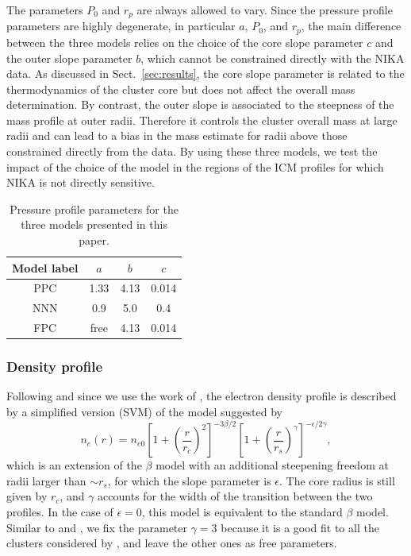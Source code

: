 \documentclass[twocolumn,traditabstract]{aa}
\begin{document}
The parameters $P_0$ and $r_p$ are always allowed to vary. Since the pressure profile parameters are highly degenerate, in particular $a$, $P_0$, and $r_p$, the main difference between the three models relies on the choice of the core slope parameter $c$ and the outer slope parameter $b$, which cannot be constrained directly with the NIKA data. As discussed in Sect.~\ref{sec:results}, the core slope parameter is related to the thermodynamics of the cluster core but does not affect the overall mass determination. By contrast, the outer slope is associated to the steepness of the mass profile at outer radii. Therefore it controls the cluster overall mass at large radii and can lead to a bias in the mass estimate for radii above those constrained directly from the data. By using these three models, we test the impact of the choice of the model in the regions of the ICM profiles for which NIKA is not directly sensitive.
\begin{table}
\caption{Pressure profile parameters for the three models presented in this paper.}
\begin{center}
\begin{tabular}{cccc}
\hline
\hline
Model label & $a$ & $b$ & $c$ \\
\hline
PPC & 1.33 & 4.13 & 0.014 \\
NNN & 0.9 & 5.0 & 0.4 \\
FPC & free & 4.13 & 0.014\\
\hline
\end{tabular}
\end{center}
\label{tab:table_pressure_models}
\end{table}

\subsubsection{Density profile}\label{sec:icm_param_n}
Following \cite{mroczkowski2009} and since we use the work of \cite{comis2011}, the electron density profile is described by a simplified version (SVM) of the model suggested by \cite{vikhlinin2006}
\begin{equation}
	n_e(r) = n_{e0} \left[1+\left(\frac{r}{r_c}\right)^2 \right]^{-3 \beta /2} \left[ 1+\left(\frac{r}{r_s}\right)^{\gamma} \right]^{-\epsilon/2 \gamma},
\label{eq:SVM}
\end{equation}
which is an extension of the $\beta$ model \citep{cavaliere1978} with an additional steepening freedom at radii larger than $\sim r_s$, for which the slope parameter is $\epsilon$. The core radius is still given by $r_c$, and $\gamma$ accounts for the width of the transition between the two profiles. In the case of $\epsilon = 0$, this model is equivalent to the standard $\beta$ model. Similar to \cite{mroczkowski2009} and \cite{comis2011}, we fix the parameter $\gamma = 3$ because it is a good fit to all the clusters considered by \cite{vikhlinin2006}, and leave the other ones as free parameters.
\end{document}
